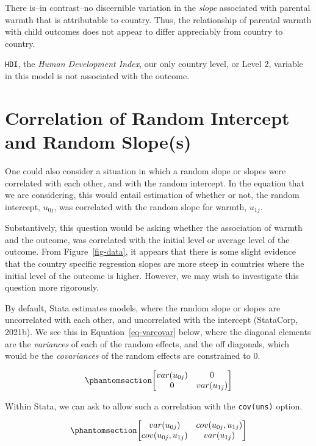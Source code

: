 \documentclass[
  letterpaper,
  DIV=11,
  numbers=noendperiod]{scrreprt}
\begin{document}
There is--in contrast--no discernible variation in the \emph{slope}
associated with parental warmth that is attributable to country. Thus,
the relationship of parental warmth with child outcomes does not appear
to differ appreciably from country to country.

\texttt{HDI}, the \emph{Human Development Index}, our only country
level, or Level 2, variable in this model is not associated with the
outcome.

\section{Correlation of Random Intercept and Random
Slope(s)}\label{correlation-of-random-intercept-and-random-slopes}

One could also consider a situation in which a random slope or slopes
were correlated with each other, and with the random intercept. In the
equation that we are considering, this would entail estimation of
whether or not, the random intercept, \(u_{0j}\), was correlated with
the random slope for warmth, \(u_{1j}\).

Substantively, this question would be asking whether the association of
warmth and the outcome, was correlated with the initial level or average
level of the outcome. From Figure~\ref{fig-data}, it appears that there
is some slight evidence that the country specific regression slopes are
more steep in countries where the initial level of the outcome is
higher. However, we may wish to investigate this question more
rigorously.

By default, Stata estimates models, where the random slope or slopes are
uncorrelated with each other, and uncorrelated with the intercept
(StataCorp, 2021b). We see this in Equation~\ref{eq-varcovar} below,
where the diagonal elements are the \emph{variances} of each of the
random effects, and the off diagonals, which would be the
\emph{covariances} of the random effects are constrained to 0.

\begin{equation}\phantomsection\label{eq-varcovar}{\begin{bmatrix}
var(u_{0j}) & 0 \\
0 & var(u_{1j}) 
\end{bmatrix}}\end{equation}

Within Stata, we can ask to allow such a correlation with the
\texttt{cov(uns)} option.

\begin{equation}\phantomsection\label{eq-varcovaruns}{\begin{bmatrix}
var(u_{0j}) & cov(u_{0j}, u_{1j}) \\
cov(u_{0j}, u_{1j}) & var(u_{1j}) 
\end{bmatrix}}\end{equation}
\end{document}

